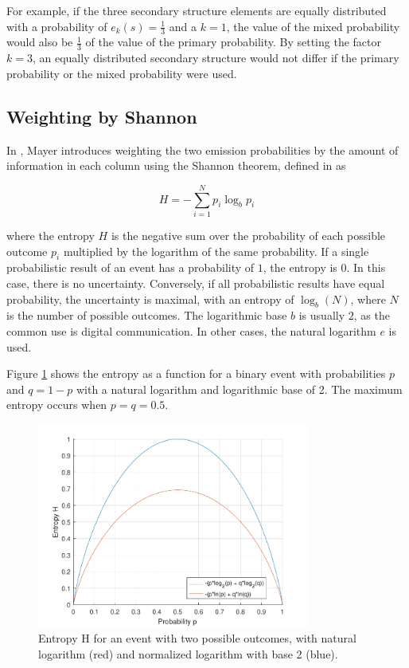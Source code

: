 For example, if the three secondary structure elements are equally distributed with a probability of $e_k(s) = \frac{1}{3}$ and a $k=1$, the value of the mixed probability would also be $\frac{1}{3}$ of the value of the primary probability. By setting the factor $k=3$, an equally distributed secondary structure would not differ if the primary probability or the mixed probability were used.  

\subsection{Weighting by Shannon}


In \cite{Mayer.2014}, Mayer introduces weighting the two emission probabilities by the amount of information in each column using the Shannon theorem, defined in \cite{Shannon.1948} as 


\begin{equation}
	H = -\sum _{i=1}^{N} p_i \log _b p_i
	\label{eq:shannon1}
\end{equation}


where the entropy $H$ is the negative sum over the probability of each possible outcome $p_i$ multiplied by the logarithm of the same probability.
If a single probabilistic result of an event has a probability of $1$, the entropy is $0$. In this case, there is no uncertainty. Conversely, if all probabilistic results have equal probability, the uncertainty is maximal, with an entropy of $\log_b(N)$, where $N$ is the number of possible outcomes.  
The logarithmic base $b$ is usually $2$, as the common use is digital communication. In other cases, the natural logarithm $e$ is used. 

Figure \ref{fig:shannon} shows the entropy as a function for a binary event with probabilities $p$ and $q = 1-p$ with a natural logarithm and logarithmic base of 2. The maximum entropy occurs when $p=q=0.5$. 

\begin{figure}[ht]
	\begin{center}
		\includegraphics[width=0.8\textwidth]{fig/shannon}
	\end{center}
	\caption[Entropy H for an event with two possible outcomes.]{Entropy H for an event with two possible outcomes, with natural logarithm (red) and normalized logarithm with base 2 (blue).} 
	\label{fig:shannon}
\end{figure}


